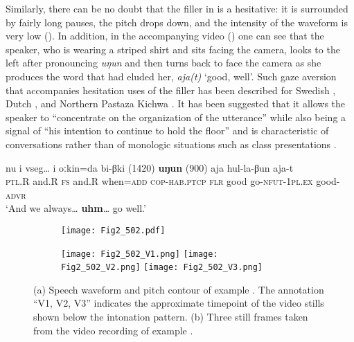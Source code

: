 \documentclass[output=paper]{langscibook}
\begin{document}
Similarly, there can be no doubt that the filler in  is a hesitative: it is surrounded by fairly long pauses, the pitch drops down, and the intensity of the waveform is very low (). In addition, in the accompanying video () one can see that the speaker, who is wearing a striped shirt and sits facing the camera, looks to the left after pronouncing \textit{uŋun} and then turns back to face the camera as she produces the word that had eluded her, \textit{aja(t)} ‘good, well’. Such gaze aversion that accompanies hesitation uses of the filler has been described for Swedish \citep{AllwoodEtAl2005}, Dutch \citep{JehoulEtAl2016}, and Northern Pastaza Kichwa . It has been suggested that it allows the speaker to “concentrate on the organization of the utterance” while also being a signal of “his intention to continue to hold the floor” \citep[42]{Kendon1967} and is characteristic of conversations rather than of monologic situations such as class presentations \citep{Kosmala2022}.


\ea \label{ex:pakendorf:5}
\gll nu
	i
	vseg…
	i
	oːkin=da
	bi-βki
	\textup{(1420)}
	\textbf{uŋun}
	\textup{(900)}
	aja hul-la-βun
	aja-t\\
    \textsc{ptl.}R
    and.R
    \textsc{fs}
    and.R
    when=\textsc{add}
    \textsc{cop-hab.ptcp}
    {}
    \textsc{flr}
    {}
    good
    go-\textsc{nfut-1pl.ex}
    good-\textsc{advr}\\
\glt ‘And we always… \textbf{uhm}… go well.’ 
\z

\begin{figure}
\centering
   \begin{subfigure}[b]{\textwidth}
   \texttt{[image: Fig2\_502.pdf]}
   \caption{}
   \label{fig:pakendorf:2a}
\end{subfigure}
\par\medskip
\begin{subfigure}[b]{\textwidth}
\texttt{[image: Fig2\_502\_V1.png]}
\texttt{[image: Fig2\_502\_V2.png]}
\texttt{[image: Fig2\_502\_V3.png]}
   \caption{}
   \label{fig:pakendorf:2b}
\end{subfigure}
\caption{(a) Speech waveform and pitch contour of example . The annotation “V1, V2, V3” indicates the approximate timepoint of the video stills shown below the intonation pattern. (b) Three still frames taken from the video recording of example .}
\label{fig:pakendorf:2}
\end{figure}
\end{document}
